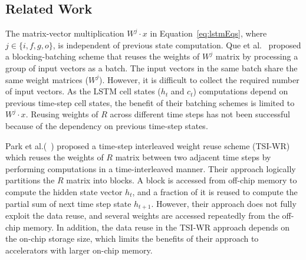 \documentclass[a4paper,10pt]{article}
\begin{document}
\subsection{Related Work}
The matrix-vector multiplication $W^j\cdot x$ in Equation~\eqref{eq:lstmEqs}, where $j\in \{i,f,g,o\}$, is independent of previous state computation. Que et al.~\cite{que2019efficient} proposed a blocking-batching scheme that reuses the weights of $W^j$ matrix by processing a group of input vectors as a batch. The input vectors in the same batch share the same weight matrices ($W^j$). However, it is difficult to collect the required number of input vectors. As the LSTM cell states ($h_t$ and $c_t$) computations depend on previous time-step cell states, the benefit of their batching schemes is limited to $W^j\cdot x$. Reusing weights of $R$ across different time steps has not been successful because of the dependency on previous time-step states.

Park et al.(~\cite{park2020time}) proposed a time-step interleaved weight reuse scheme (TSI-WR) which reuses the weights of $R$ matrix between two adjacent time steps by performing computations in a time-interleaved manner. Their approach logically partitions the $R$ matrix into blocks. A block is accessed from off-chip memory to compute the hidden state vector $h_t$, and a fraction of it is reused to compute the partial sum of next time step state $h_{t+1}$. However, their approach does not fully exploit the data reuse, and several weights are accessed repeatedly from the off-chip memory. In addition, the data reuse in the TSI-WR approach depends on the on-chip storage size, which limits the benefits of their approach to accelerators with larger on-chip memory.
\end{document}
